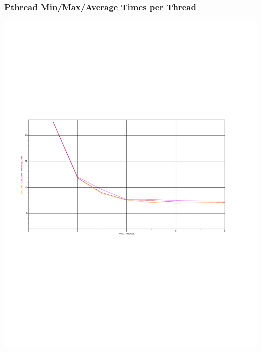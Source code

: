 \documentclass{article}
\begin{document}
\subsubsection*{Pthread Min/Max/Average Times per Thread}
\includegraphics[scale=0.5]{images/pthread_time.pdf}
\end{document}
